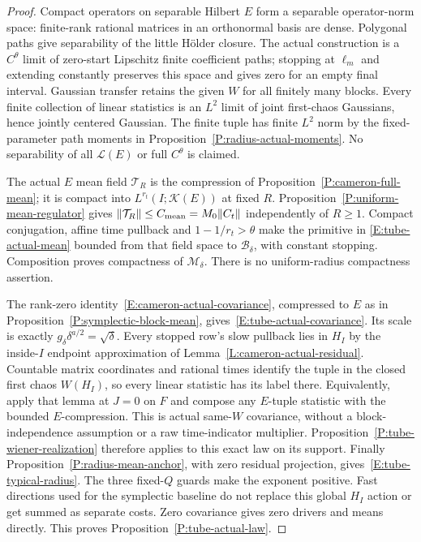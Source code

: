 \begin{proof}
  Compact operators on separable Hilbert $E$ form a separable
  operator-norm space: finite-rank rational matrices in an
  orthonormal basis are dense.
  Polygonal paths give separability of the little H\"older closure.
  The actual construction is a $C^\theta$ limit of zero-start
  Lipschitz finite coefficient paths; stopping at $\ell_m$
  and extending constantly preserves this space and gives zero
  for an empty final interval.
  Gaussian transfer retains the given $W$ for all finitely many blocks.
  Every finite collection of linear statistics is an $L^2$ limit
  of joint first-chaos Gaussians, hence jointly centered Gaussian.
  The finite tuple has finite $L^2$ norm by the fixed-parameter
  path moments in Proposition~\ref{P:radius-actual-moments}.
  No separability of all $\mathcal L(E)$ or full $C^\theta$ is claimed.

  The actual $E$ mean field $\mathcal T_R$ is the compression
  of Proposition~\ref{P:cameron-full-mean}; it is compact into
  $L^{r_t}(I;\mathcal K(E))$ at fixed $R$.
  Proposition~\ref{P:uniform-mean-regulator} gives
  $\|\mathcal T_R\|\le C_{\rm mean}=M_0\|C_t\|$ independently of $R\ge1$.
  Compact conjugation, affine time pullback and
  $1-1/r_t>\theta$ make the primitive in
  \eqref{E:tube-actual-mean} bounded from that field space to
  $\mathscr B_\delta$, with constant stopping.
  Composition proves compactness of $\mathcal M_\delta$.
  There is no uniform-radius compactness assertion.

  The rank-zero identity~\eqref{E:cameron-actual-covariance},
  compressed to $E$ as in Proposition~\ref{P:symplectic-block-mean},
  gives~\eqref{E:tube-actual-covariance}.
  Its scale is exactly $g_\delta\delta^{a/2}=\sqrt\delta$.
  Every stopped row's slow pullback lies in $H_I$ by the
  inside-$I$ endpoint approximation of Lemma~\ref{L:cameron-actual-residual}.
  Countable matrix coordinates and rational times identify the
  tuple in the closed first chaos $W(H_I)$, so every linear
  statistic has its label there.
  Equivalently, apply that lemma at $J=0$ on $F$ and compose
  any $E$-tuple statistic with the bounded $E$-compression.
  This is actual same-$W$ covariance, without a block-independence
  assumption or a raw time-indicator multiplier.
  Proposition~\ref{P:tube-wiener-realization} therefore applies
  to this exact law on its support.
  Finally Proposition~\ref{P:radius-mean-anchor}, with zero
  residual projection, gives~\eqref{E:tube-typical-radius}.
  The three fixed-$Q$ guards make the exponent positive.
  Fast directions used for the symplectic baseline do not replace
  this global $H_I$ action or get summed as separate costs.
  Zero covariance gives zero drivers and means directly.
  This proves Proposition~\ref{P:tube-actual-law}.
\end{proof}

